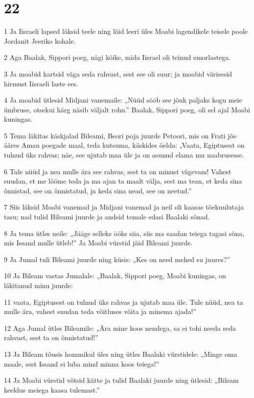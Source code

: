 \chapter{22}

\par 1 Ja Iisraeli lapsed läksid teele ning lõid leeri üles Moabi lagendikele teisele poole Jordanit Jeeriko kohale.
\par 2 Aga Baalak, Sippori poeg, nägi kõike, mida Iisrael oli teinud emorlastega.
\par 3 Ja moabid kartsid väga seda rahvast, sest see oli suur; ja moabid värisesid hirmust Iisraeli laste ees.
\par 4 Ja moabid ütlesid Midjani vanemaile: „Nüüd sööb see jõuk paljaks kogu meie ümbruse, otsekui härg näsib väljalt rohu.” Baalak, Sippori poeg, oli sel ajal Moabi kuningas.
\par 5 Tema läkitas käskjalad Bileami, Beori poja juurde Petoori, mis on Frati jõe ääres Amau poegade maal, teda kutsuma, käskides öelda: „Vaata, Egiptusest on tulnud üks rahvas; näe, see ujutab maa üle ja on asunud elama mu naabrusesse.
\par 6 Tule nüüd ja nea mulle ära see rahvas, sest ta on minust vägevam! Vahest suudan, et me lööme teda ja ma ajan ta maalt välja, sest ma tean, et keda sina õnnistad, see on õnnistatud, ja keda sina nead, see on neetud.”
\par 7 Siis läksid Moabi vanemad ja Midjani vanemad ja neil oli kaasas tõekuulutaja tasu; nad tulid Bileami juurde ja andsid temale edasi Baalaki sõnad.
\par 8 Ja tema ütles neile: „Jääge selleks ööks siia, siis ma saadan teiega tagasi sõna, mis Issand mulle ütleb!” Ja Moabi vürstid jäid Bileami juurde.
\par 9 Ja Jumal tuli Bileami juurde ning küsis: „Kes on need mehed su juures?”
\par 10 Ja Bileam vastas Jumalale: „Baalak, Sippori poeg, Moabi kuningas, on läkitanud minu juurde:
\par 11 vaata, Egiptusest on tulnud üks rahvas ja ujutab maa üle. Tule nüüd, nea ta mulle ära, vahest suudan teda võitluses võita ja minema ajada!”
\par 12 Aga Jumal ütles Bileamile: „Ära mine koos nendega, sa ei tohi needa seda rahvast, sest ta on õnnistatud!”
\par 13 Ja Bileam tõusis hommikul üles ning ütles Baalaki vürstidele: „Minge oma maale, sest Issand ei luba mind minna koos teiega!”
\par 14 Ja Moabi vürstid võtsid kätte ja tulid Baalaki juurde ning ütlesid: „Bileam keeldus meiega kaasa tulemast.”
